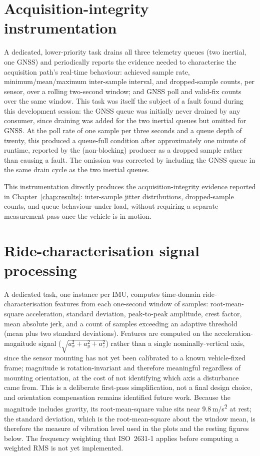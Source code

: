 \section{Acquisition-integrity instrumentation}
\label{sec:acquisition-instrumentation}

A dedicated, lower-priority task drains all three telemetry queues (two inertial, one GNSS) and periodically reports the evidence needed to characterise the acquisition path's real-time behaviour: achieved sample rate, minimum/mean/maximum inter-sample interval, and dropped-sample counts, per sensor, over a rolling two-second window; and GNSS poll and valid-fix counts over the same window. This task was itself the subject of a fault found during this development session: the GNSS queue was initially never drained by any consumer, since draining was added for the two inertial queues but omitted for GNSS. At the poll rate of one sample per three seconds and a queue depth of twenty, this produced a queue-full condition after approximately one minute of runtime, reported by the (non-blocking) producer as a dropped sample rather than causing a fault. The omission was corrected by including the GNSS queue in the same drain cycle as the two inertial queues.

This instrumentation directly produces the acquisition-integrity evidence reported in Chapter~\ref{chap:results}: inter-sample jitter distributions, dropped-sample counts, and queue behaviour under load, without requiring a separate measurement pass once the vehicle is in motion.

\section{Ride-characterisation signal processing}
\label{sec:ride-characterisation}

A dedicated task, one instance per IMU, computes time-domain ride-characterisation features from each one-second window of samples: root-mean-square acceleration, standard deviation, peak-to-peak amplitude, crest factor, mean absolute jerk, and a count of samples exceeding an adaptive threshold (mean plus two standard deviations). Features are computed on the acceleration-magnitude signal ($\sqrt{a_x^2+a_y^2+a_z^2}$) rather than a single nominally-vertical axis, since the sensor mounting has not yet been calibrated to a known vehicle-fixed frame; magnitude is rotation-invariant and therefore meaningful regardless of mounting orientation, at the cost of not identifying which axis a disturbance came from. This is a deliberate first-pass simplification, not a final design choice, and orientation compensation remains identified future work. Because the magnitude includes gravity, its root-mean-square value sits near 9.8\,m/s\textsuperscript{2} at rest; the standard deviation, which is the root-mean-square about the window mean, is therefore the measure of vibration level used in the plots and the resting figures below. The frequency weighting that ISO~2631-1 applies before computing a weighted RMS is not yet implemented.

